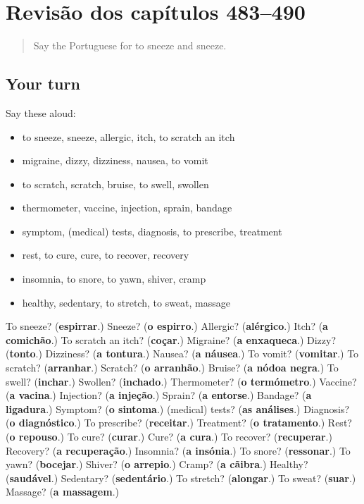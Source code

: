 \section[(dialogue)]{Revisão dos capítulos 483–490}

\label{lesson:PT-R490-revisao-483-490}



\begin{quote}
Say the Portuguese for to sneeze and sneeze.
\end{quote}

\subsection*{Your turn}
Say these aloud:

\begin{itemize}
\raggedright
  \item to sneeze, sneeze, allergic, itch, to scratch an itch
  \item migraine, dizzy, dizziness, nausea, to vomit
  \item to scratch, scratch, bruise, to swell, swollen
  \item thermometer, vaccine, injection, sprain, bandage
  \item symptom, (medical) tests, diagnosis, to prescribe, treatment
  \item rest, to cure, cure, to recover, recovery
  \item insomnia, to snore, to yawn, shiver, cramp
  \item healthy, sedentary, to stretch, to sweat, massage
\end{itemize}

\begin{tcolorbox}[breakable,colback=teal!4,colframe=teal!35!black,title={Before you move on}]
To sneeze? (\textbf{espirrar}.) Sneeze? (\textbf{o espirro}.) Allergic? (\textbf{alérgico}.) Itch? (\textbf{a comichão}.) To scratch an itch? (\textbf{coçar}.) Migraine? (\textbf{a enxaqueca}.) Dizzy? (\textbf{tonto}.) Dizziness? (\textbf{a tontura}.) Nausea? (\textbf{a náusea}.) To vomit? (\textbf{vomitar}.) To scratch? (\textbf{arranhar}.) Scratch? (\textbf{o arranhão}.) Bruise? (\textbf{a nódoa negra}.) To swell? (\textbf{inchar}.) Swollen? (\textbf{inchado}.) Thermometer? (\textbf{o termómetro}.) Vaccine? (\textbf{a vacina}.) Injection? (\textbf{a injeção}.) Sprain? (\textbf{a entorse}.) Bandage? (\textbf{a ligadura}.) Symptom? (\textbf{o sintoma}.) (medical) tests? (\textbf{as análises}.) Diagnosis? (\textbf{o diagnóstico}.) To prescribe? (\textbf{receitar}.) Treatment? (\textbf{o tratamento}.) Rest? (\textbf{o repouso}.) To cure? (\textbf{curar}.) Cure? (\textbf{a cura}.) To recover? (\textbf{recuperar}.) Recovery? (\textbf{a recuperação}.) Insomnia? (\textbf{a insónia}.) To snore? (\textbf{ressonar}.) To yawn? (\textbf{bocejar}.) Shiver? (\textbf{o arrepio}.) Cramp? (\textbf{a cãibra}.) Healthy? (\textbf{saudável}.) Sedentary? (\textbf{sedentário}.) To stretch? (\textbf{alongar}.) To sweat? (\textbf{suar}.) Massage? (\textbf{a massagem}.)
\end{tcolorbox}
